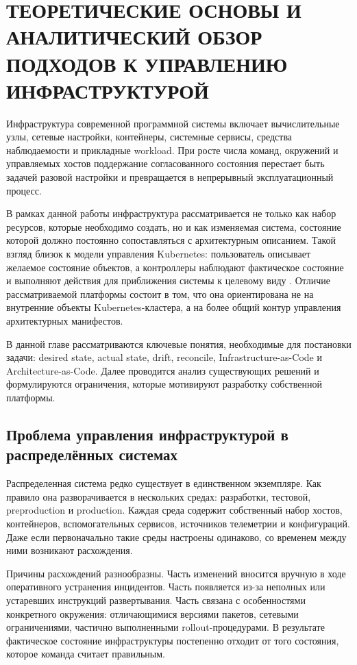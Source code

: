 \section{ТЕОРЕТИЧЕСКИЕ ОСНОВЫ И АНАЛИТИЧЕСКИЙ ОБЗОР ПОДХОДОВ К УПРАВЛЕНИЮ ИНФРАСТРУКТУРОЙ}

Инфраструктура современной программной системы включает вычислительные узлы, сетевые настройки, контейнеры, системные сервисы, средства наблюдаемости и прикладные workload. При росте числа команд, окружений и управляемых хостов поддержание согласованного состояния перестает быть задачей разовой настройки и превращается в непрерывный эксплуатационный процесс.

В рамках данной работы инфраструктура рассматривается не только как набор ресурсов, которые необходимо создать, но и как изменяемая система, состояние которой должно постоянно сопоставляться с архитектурным описанием. Такой взгляд близок к модели управления Kubernetes: пользователь описывает желаемое состояние объектов, а контроллеры наблюдают фактическое состояние и выполняют действия для приближения системы к целевому виду \cite{kubernetes_controllers,kubernetes_objects}. Отличие рассматриваемой платформы состоит в том, что она ориентирована не на внутренние объекты Kubernetes-кластера, а на более общий контур управления архитектурных манифестов.

В данной главе рассматриваются ключевые понятия, необходимые для постановки задачи: desired state, actual state, drift, reconcile, Infrastructure-as-Code и Architecture-as-Code. Далее проводится анализ существующих решений и формулируются ограничения, которые мотивируют разработку собственной платформы.

\subsection{Проблема управления инфраструктурой в распределённых системах}

Распределенная система редко существует в единственном экземпляре. Как правило она разворачивается в нескольких средах: разработки, тестовой, preproduction и production. Каждая среда содержит собственный набор хостов, контейнеров, вспомогательных сервисов, источников телеметрии и конфигураций. Даже если первоначально такие среды настроены одинаково, со временем между ними возникают расхождения.

Причины расхождений разнообразны. Часть изменений вносится вручную в ходе оперативного устранения инцидентов. Часть появляется из-за неполных или устаревших инструкций развертывания. Часть связана с особенностями конкретного окружения: отличающимися версиями пакетов, сетевыми ограничениями, частично выполненными rollout-процедурами. В результате фактическое состояние инфраструктуры постепенно отходит от того состояния, которое команда считает правильным.

